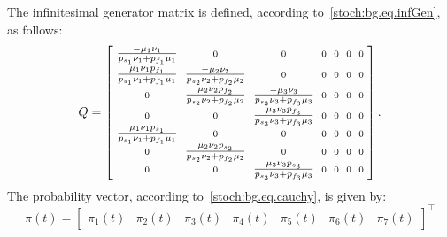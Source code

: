 \begin{example}
The infinitesimal generator matrix is defined, according to~\eqref{stoch:bg.eq.infGen}, as follows:
\begin{equation}
\label{stoch:app.eq.exQ}
\setlength\arraycolsep{3pt}
Q=\left[
\begin{array}{ccccccc}
\frac{-\mu_1 \nu_1 }{p_{s_1}\nu_1+p_{f_1}\mu_1} & \scriptstyle{0} & \scriptstyle{0}  & \scriptstyle{0}  & \scriptstyle{0}  & \scriptstyle{0}& \scriptstyle{0}  \\[1ex]
\frac{\mu_1 \nu_1 p_{f_1} }{p_{s_1}\nu_1+p_{f_1}\mu_1} & \frac{-\mu_2 \nu_2 }{p_{s_2}\nu_2+p_{f_2}\mu_2} & \scriptstyle{0}  & \scriptstyle{0}  & \scriptstyle{0}  & \scriptstyle{0}  & \scriptstyle{0}  \\ [1ex]
\scriptstyle{0}  & \frac{\mu_2 \nu_2 p_{f_2} }{p_{s_2}\nu_2+p_{f_2}\mu_2} & \frac{-\mu_3 \nu_3 }{p_{s_3}\nu_3+p_{f_3}\mu_3} & \scriptstyle{0}  & \scriptstyle{0}  & \scriptstyle{0}  & \scriptstyle{0}  \\ [1ex]
\scriptstyle{0}  & \scriptstyle{0}  & \frac{\mu_3 \nu_3 p_{f_3} }{p_{s_3}\nu_3+p_{f_3}\mu_3} & \scriptstyle{0}  & \scriptstyle{0}  & \scriptstyle{0}  & \scriptstyle{0}  \\ 
\frac{\mu_1 \nu_1 p_{s_1} }{p_{s_1}\nu_1+p_{f_1}\mu_1} & \scriptstyle{0}  & \scriptstyle{0}  & \scriptstyle{0}  & \scriptstyle{0}  & \scriptstyle{0}  & \scriptstyle{0}  \\ 
\scriptstyle{0}  & \frac{\mu_2 \nu_2 p_{s_2} }{p_{s_2}\nu_2+p_{f_2}\mu_2} & \scriptstyle{0}  & \scriptstyle{0}  & \scriptstyle{0}  & \scriptstyle{0}  & \scriptstyle{0}  \\ 
\scriptstyle{0}  & \scriptstyle{0}  & \frac{\mu_3 \nu_3 p_{s_3} }{p_{s_3}\nu_3+p_{f_3}\mu_3} & \scriptstyle{0}  & \scriptstyle{0}  & \scriptstyle{0}  & \scriptstyle{0} 
\end{array} \right].
\end{equation}
The probability vector, according to~\eqref{stoch:bg.eq.cauchy}, is given by:
\begin{equation}
\pi(t)=\left[\begin{array}{ccccccc}
\pi_1(t)&\!\!\!\pi_2(t)&\!\!\!\pi_3(t)&\!\!\!\pi_4(t)&\!\!\!\pi_5(t)&\!\!\!\pi_6(t)&\!\!\!\pi_7(t)
\end{array}\right]^\top
\end{equation}

\end{example}
